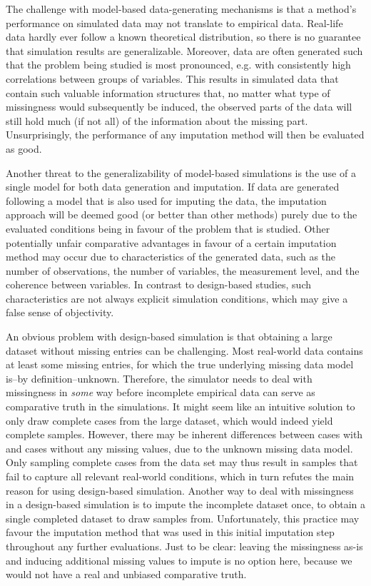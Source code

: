 \documentclass[bimj,fleqn]{w-art}
\begin{document}
The challenge with model-based data-generating mechanisms is that a method's performance on simulated data may not translate to empirical data. Real-life data hardly ever follow a known theoretical distribution, so there is no guarantee that simulation results are generalizable. Moreover, data are often generated such that the problem being studied is most pronounced, e.g. with consistently high correlations between groups of variables. This results in simulated data that contain such valuable information structures that, no matter what type of missingness would subsequently be induced, the observed parts of the data will still hold much (if not all) of the information about the missing part. Unsurprisingly, the performance of any imputation method will then be evaluated as good.

Another threat to the generalizability of model-based simulations is the use of a single model for both data generation and imputation. If data are generated following a model that is also used for imputing the data, the imputation approach will be deemed good (or better than other methods) purely due to the evaluated conditions being in favour of the problem that is studied. Other potentially unfair comparative advantages in favour of a certain imputation method may occur due to characteristics of the generated data, such as the number of observations, the number of variables, the measurement level, and the coherence between variables. In contrast to design-based studies, such characteristics are not always explicit simulation conditions, which may give a false sense of objectivity.

An obvious problem with design-based simulation is that obtaining a large dataset without missing entries can be challenging. Most real-world data contains at least some missing entries, for which the true underlying missing data model is--by definition--unknown. Therefore, the simulator needs to deal with missingness in \textit{some} way before incomplete empirical data can serve as comparative truth in the simulations. It might seem like an intuitive solution to only draw complete cases from the large dataset, which would indeed yield complete samples. However, there may be inherent differences between cases with and cases without any missing values, due to the unknown missing data model. Only sampling complete cases from the data set may thus result in samples that fail to capture all relevant real-world conditions, which in turn refutes the main reason for using design-based simulation. Another way to deal with missingness in a design-based simulation is to impute the incomplete dataset once, to obtain a single completed dataset to draw samples from. Unfortunately, this practice may favour the imputation method that was used in this initial imputation step throughout any further evaluations. Just to be clear: leaving the missingness as-is and inducing additional missing values to impute is no option here, because we would not have a real and unbiased comparative truth.
\end{document}
